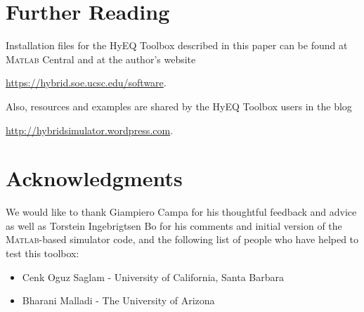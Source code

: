 \documentclass{article}
\newcommand{\matlab}{\textsc{Matlab}}
\begin{document}









\section{Further Reading}
\label{sec:closingremarks}
\noindent Installation files for the HyEQ Toolbox described in this paper can be found 
at \matlab{} Central and at the author's website
\begin{center}
\url{https://hybrid.soe.ucsc.edu/software}.
\end{center}
Also, resources and examples are shared by the HyEQ Toolbox users in the blog
\begin{center}
\url{http://hybridsimulator.wordpress.com}.
\end{center}

\section{Acknowledgments}
\label{sec:acknowledgments}

We would like to thank Giampiero Campa for his thoughtful feedback 
and advice as well as Torstein Ingebrigtsen Bo for his comments 
and initial version of the \matlab{}-based simulator code, 
and the following list of people who have helped to test this toolbox:

\begin{itemize}
\item Cenk Oguz Saglam - University of California, Santa Barbara
\item Bharani Malladi - The University of Arizona
\end{itemize}

 
\label{sec:refs}


\end{document}
